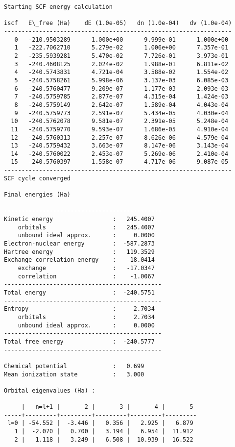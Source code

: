 \documentclass[11pt]{article}
\begin{document}
    \begin{Verbatim}[commandchars=\\\{\}]
Starting SCF energy calculation

iscf   E\_free (Ha)    dE (1.0e-05)   dn (1.0e-04)   dv (1.0e-04)
-----------------------------------------------------------------
   0   -210.9503289      1.000e+00      9.999e-01      1.000e+00
   1   -222.7062710      5.279e-02      1.006e+00      7.357e-01
   2   -235.5939281      5.470e-02      7.726e-01      3.973e-01
   3   -240.4608125      2.024e-02      1.988e-01      6.811e-02
   4   -240.5743831      4.721e-04      3.588e-02      1.554e-02
   5   -240.5758261      5.998e-06      3.137e-03      6.085e-03
   6   -240.5760477      9.209e-07      1.177e-03      2.093e-03
   7   -240.5759785      2.877e-07      4.315e-04      1.424e-03
   8   -240.5759149      2.642e-07      1.589e-04      4.043e-04
   9   -240.5759773      2.591e-07      5.434e-05      4.030e-04
  10   -240.5762078      9.581e-07      2.391e-05      5.248e-04
  11   -240.5759770      9.593e-07      1.686e-05      4.910e-04
  12   -240.5760313      2.257e-07      8.626e-06      4.579e-04
  13   -240.5759432      3.663e-07      8.147e-06      3.143e-04
  14   -240.5760022      2.453e-07      5.269e-06      2.410e-04
  15   -240.5760397      1.558e-07      4.717e-06      9.087e-05
-----------------------------------------------------------------
SCF cycle converged

Final energies (Ha)

---------------------------------------------
Kinetic energy                 :   245.4007
    orbitals                   :   245.4007
    unbound ideal approx.      :     0.0000
Electron-nuclear energy        :  -587.2873
Hartree energy                 :   119.3529
Exchange-correlation energy    :   -18.0414
    exchange                   :   -17.0347
    correlation                :    -1.0067
---------------------------------------------
Total energy                   :  -240.5751
---------------------------------------------
Entropy                        :     2.7034
    orbitals                   :     2.7034
    unbound ideal approx.      :     0.0000
---------------------------------------------
Total free energy              :  -240.5777
---------------------------------------------

Chemical potential             :   0.699
Mean ionization state          :   3.000

Orbital eigenvalues (Ha) :

     |   n=l+1 |       2 |       3 |       4 |       5
-----+---------+---------+---------+---------+---------
 l=0 | -54.552 |  -3.446 |   0.356 |   2.925 |   6.879
   1 |  -2.070 |   0.700 |   3.194 |   6.954 |  11.912
   2 |   1.118 |   3.249 |   6.508 |  10.939 |  16.522



\end{Verbatim}
\end{document}
